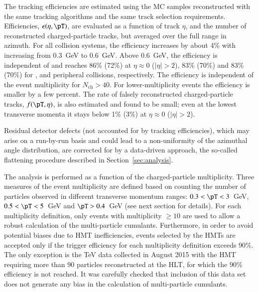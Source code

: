 \documentclass[cernpreprint,texlive=2014,txfonts,UKenglish]{latex/atlasdoc}
\begin{document}
The tracking efficiencies are estimated using the MC samples reconstructed with the same tracking algorithms and the same track selection requirements. Efficiencies, $\epsilon(\eta, \pT)$, are evaluated as a function of track $\eta$, \pT  and the number of reconstructed charged-particle tracks, but averaged over the full range in azimuth. For all collision systems, the efficiency increases by about 4\% with \pT increasing from 0.3~GeV to 0.6~GeV. Above 0.6~GeV, the efficiency is independent of \pT and reaches 86\% (72\%) at $\eta\approx 0$ ($|\eta|>2$),
83\% (70\%) and 83\% (70\%) for \pp, \pPb and peripheral \PbPb collisions, respectively. The efficiency is independent of the event multiplicity for $N_{\mathrm{ch}} > 40$.  For lower-multiplicity events the efficiency is smaller by a few percent. The rate of falsely reconstructed charged-particle tracks, $f(\pT,\eta)$, is also estimated and found to be small; even at the lowest transverse momenta it stays below 1\% (3\%) at  $\eta\approx 0$ ($|\eta|>2$).

Residual detector defects (not accounted for by tracking efficiencies), which may arise on a run-by-run basis and could lead to a non-uniformity of the azimuthal angle distribution, are corrected for by a data-driven approach, the so-called flattening procedure  described in Section~\ref{sec:analysis}. 

The analysis is performed as a function of the charged-particle multiplicity. Three measures of the event multiplicity are defined based on counting the number of particles observed in different transverse momentum ranges: $0.3 < \pT < 3$~GeV,  $0.5 < \pT < 5$~GeV and $\pT > 0.4$~GeV  (see next section for details). For each multiplicity definition, only events with multiplicity $\geq 10$ are used to allow a robust calculation of the multi-particle cumulants. Furthermore, in order to avoid potential biases due to HMT inefficiencies, events selected by the HMTs are accepted only if the trigger efficiency for each multiplicity definition exceeds 90\%. The only exception is the  TeV data collected in August 2015 with the HMT requiring more than 90 particles reconstructed at the HLT, for which the 90\% efficiency is not reached. It was carefully checked that inclusion of this data set does not generate any bias in the calculation of multi-particle cumulants.

\end{document}
